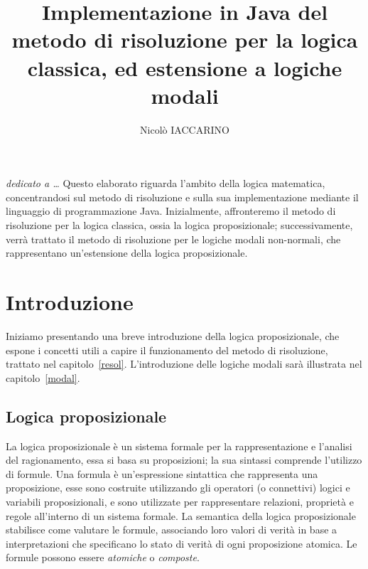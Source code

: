 \documentclass[a4paper,12pt]{report}
\begin{document}
\title{Implementazione in Java del metodo di risoluzione per la logica classica, ed estensione a logiche modali}
\author{Nicolò IACCARINO}
% 
%
\beforepreface
{}
        {\hfill \Large {\sl dedicato a \dots}}
% 
%
Questo elaborato riguarda l'ambito della logica matematica, concentrandosi sul metodo di risoluzione e sulla sua implementazione mediante il linguaggio di programmazione Java. Inizialmente, affronteremo il metodo di risoluzione per la logica classica, ossia la logica proposizionale; successivamente, verrà trattato il metodo di risoluzione per le logiche modali non-normali, che rappresentano un'estensione della logica proposizionale.
%
%

\afterpreface
\pagestyle{mystyle} %
% 
% 
\chapter{Introduzione}
\label{intro}

Iniziamo presentando una breve introduzione della logica proposizionale, che espone i concetti utili a capire il funzionamento del metodo di risoluzione, trattato nel capitolo~\ref{resol}. L'introduzione delle logiche modali sarà illustrata nel capitolo~\ref{modal}.
\section{Logica proposizionale}
La logica proposizionale è un sistema formale per la rappresentazione e l'analisi del ragionamento, essa si basa su proposizioni; la sua sintassi comprende l'utilizzo di formule. Una formula è un'espressione sintattica che rappresenta una proposizione, esse sono costruite utilizzando gli operatori (o connettivi) logici e variabili proposizionali, e sono utilizzate per rappresentare relazioni, proprietà e regole all'interno di un sistema formale.
La semantica della logica proposizionale stabilisce come valutare le formule, associando loro valori di verità in base a interpretazioni che specificano lo stato di verità di ogni proposizione atomica. Le formule possono essere \emph{atomiche} o \emph{composte}.
\end{document}
